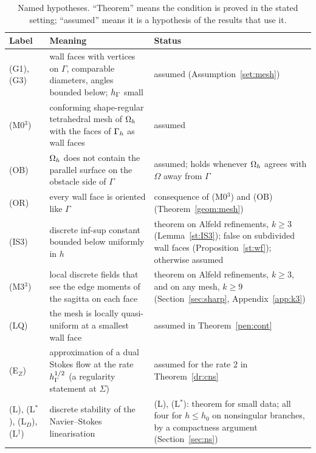 \begin{table}[t]
\centering\footnotesize
\caption{Named hypotheses. ``Theorem'' means the condition is proved in the stated setting; ``assumed'' means it is a hypothesis of the results that use it.}\label{tab:hyp}
\begin{tabular}{>{\raggedright\arraybackslash}p{}>{\raggedright\arraybackslash}p{}>{\raggedright\arraybackslash}p{}}
\toprule
Label & Meaning & Status\\
\midrule
(G1), (G3) & wall faces with vertices on $\Gamma$, comparable diameters, angles bounded below; $h_\Gamma$ small & assumed (Assumption~\ref{set:mesh})\\
(M0$^3$) & conforming shape-regular tetrahedral mesh of $\Omega_h$ with the faces of $\Gamma_h$ as wall faces & assumed\\
(OB) & $\Omega_h$ does not contain the parallel surface on the obstacle side of $\Gamma$ & assumed; holds whenever $\Omega_h$ agrees with $\Omega$ away from $\Gamma$\\
(OR) & every wall face is oriented like $\Gamma$ & consequence of (M0$^3$) and (OB) (Theorem~\ref{geom:mesh})\\
(IS3) & discrete inf-sup constant bounded below uniformly in $h$ & theorem on Alfeld refinements, $k\ge3$ (Lemma~\ref{st:IS3}); false on subdivided wall faces (Proposition~\ref{st:wf}); otherwise assumed\\
(M3$^3$) & local discrete fields that see the edge moments of the sagitta on each face & theorem on Alfeld refinements, $k\ge3$, and on any mesh, $k\ge9$ (Section~\ref{sec:sharp}, Appendix~\ref{app:k3})\\
(LQ) & the mesh is locally quasi-uniform at a smallest wall face & assumed in Theorem~\ref{pen:cont}\\
(E$_Z$) & approximation of a dual Stokes flow at the rate $h_\Gamma^{1/2}$ (a regularity statement at $\Sigma$) & assumed for the rate $2$ in Theorem~\ref{dr:cns}\\
(L), (L$^\ast$), (L$_D$), (L$^\dagger$) & discrete stability of the Navier--Stokes linearisation & (L), (L$^\ast$): theorem for small data; all four for $h\le h_0$ on nonsingular branches, by a compactness argument (Section~\ref{sec:ns})\\
\bottomrule
\end{tabular}
\end{table}
